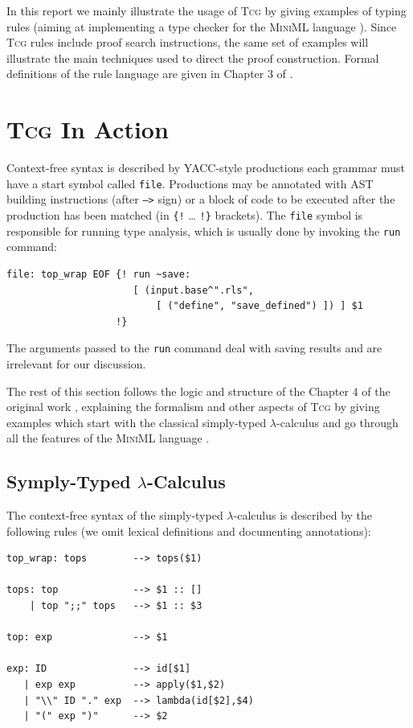 \documentclass[a4paper,12pt]{article}
\newcommand{\Tcg}{\textsc{Tcg}}
\newcommand{\code}[1]{\texttt{#1}}
\begin{document}
In this report we mainly illustrate the usage of \Tcg{} by giving examples of typing rules (aiming at implementing a type checker for the \textsc{MiniML} language \cite{MiniML}).
Since \Tcg{} rules include proof search instructions, the same set of examples will illustrate the main techniques used to direct the proof construction. Formal definitions of the rule language are given in Chapter 3 of \cite{Tcg}.


\section{\Tcg{} In Action}

Context-free syntax is described by YACC-style productions each grammar must have a start symbol called \code{file}. Productions may be annotated with AST building instructions (after \code{-->} sign) or a block of code to be executed after the production has been matched (in \code{\{!} \ldots{} \code{!\}} brackets). The \code{file} symbol is responsible for running type analysis, which is usually done by invoking the \code{run} command:

\begin{verbatim}
file: top_wrap EOF {! run ~save: 
                      [ (input.base^".rls",
                          [ ("define", "save_defined") ]) ] $1 
                   !}
\end{verbatim}

The arguments passed to the \code{run} command deal with saving results and are irrelevant for our discussion.

The rest of this section follows the logic and structure of the Chapter 4 of the original work \cite{Tcg}, explaining the formalism and other aspects of \Tcg{} by giving examples which start with the classical simply-typed $\lambda$-calculus and go through all the features of the \textsc{MiniML} language \cite{MiniML}.

\subsection{Symply-Typed $\lambda$-Calculus}

The context-free syntax of the simply-typed $\lambda$-calculus is described by the following rules (we omit lexical definitions and documenting annotations):

\begin{verbatim}
top_wrap: tops        --> tops($1)

tops: top             --> $1 :: []
    | top ";;" tops   --> $1 :: $3

top: exp              --> $1

exp: ID               --> id[$1]
   | exp exp          --> apply($1,$2)
   | "\\" ID "." exp  --> lambda(id[$2],$4)
   | "(" exp ")"      --> $2
\end{verbatim}
\end{document}
